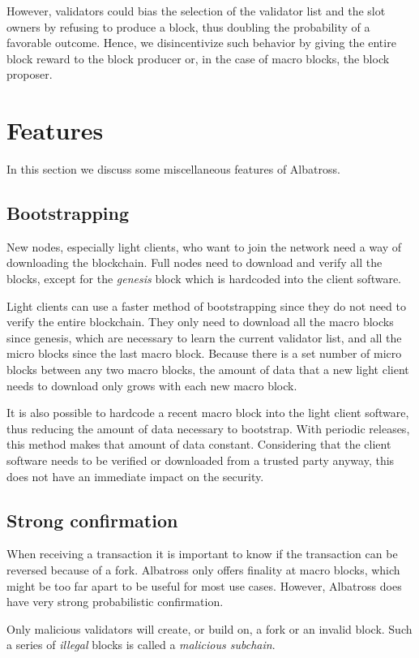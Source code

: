 \documentclass[conference]{IEEEtran}
\begin{document}
However, validators could bias the selection of the validator list and the slot owners by refusing to produce a block, thus doubling the probability of a favorable outcome. Hence, we disincentivize such behavior by giving the entire block reward to the block producer or, in the case of macro blocks, the block proposer.

\section{Features}
In this section we discuss some miscellaneous features of Albatross.

\subsection{Bootstrapping}
New nodes, especially light clients, who want to join the network need a way of downloading the blockchain. Full nodes need to download and verify all the blocks, except for the \textit{genesis} block which is hardcoded into the client software.

Light clients can use a faster method of bootstrapping since they do not need to verify the entire blockchain. They only need to download all the macro blocks since genesis, which are necessary to learn the current validator list, and all the micro blocks since the last macro block. Because there is a set number of micro blocks between any two macro blocks, the amount of data that a new light client needs to download only grows with each new macro block.

It is also possible to hardcode a recent macro block into the light client software, thus reducing the amount of data necessary to bootstrap. With periodic releases, this method makes that amount of data constant. Considering that the client software needs to be verified or downloaded from a trusted party anyway, this does not have an immediate impact on the security.

\subsection{Strong confirmation}
When receiving a transaction it is important to know if the transaction can be reversed because of a fork. Albatross only offers finality at macro blocks, which might be too far apart to be useful for most use cases. However, Albatross does have very strong probabilistic confirmation.

Only malicious validators will create, or build on, a fork or an invalid block. Such a series of \textit{illegal} blocks is called a \textit{malicious subchain}.
\end{document}
